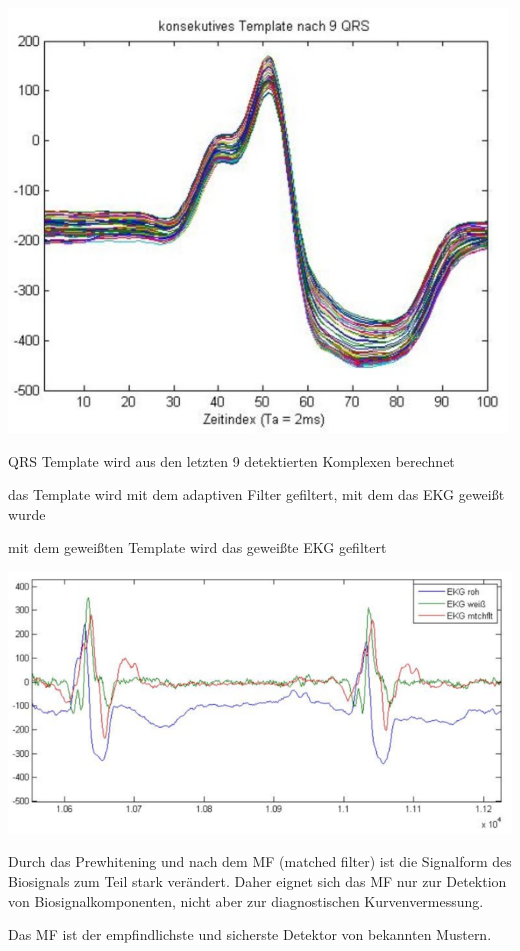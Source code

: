 \documentclass[a4paper]{article}
\begin{document}
\begin{multicols}{3}
  \begin{itemize*}
    \item \includegraphics[width=.5\linewidth]{Assets/Biosignalverarbeitung-adaptiver-filter-qrs.png}
    \item QRS Template wird aus den letzten 9 detektierten Komplexen berechnet
    \item das Template wird mit dem adaptiven Filter gefiltert, mit dem das EKG geweißt wurde
    \item mit dem geweißten Template wird das geweißte EKG gefiltert
    \item \includegraphics[width=.5\linewidth]{Assets/Biosignalverarbeitung-adaptiver-filter-ekg-mtchfit.png}
    \item Durch das Prewhitening und nach dem MF (matched filter) ist die Signalform des Biosignals zum Teil stark verändert. Daher eignet sich das MF nur zur Detektion von Biosignalkomponenten, nicht aber zur diagnostischen Kurvenvermessung.
    \item Das MF ist der empfindlichste und sicherste Detektor von bekannten Mustern.
  \end{itemize*}

\end{multicols}
\end{document}
